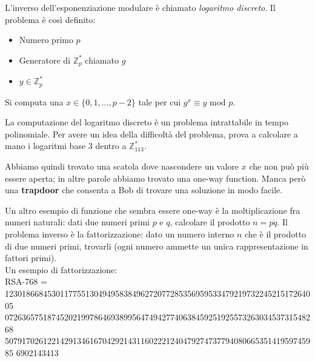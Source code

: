 \medskip

	\begin{algorithmic}
	\EndIf
	\EndFor
	\end{algorithmic}

\medskip

L'inverso dell'esponenziazione modulare è chiamato \textit{logaritmo discreto}.
Il problema è così definito:
\begin{itemize}
	\item Numero primo $p$
	\item Generatore di $\mathbb{Z}_p^*$ chiamato $g$
	\item $y \in \mathbb{Z}_p^*$
\end{itemize}
Si computa una $x \in \{0, 1, ..., p-2\}$ tale per cui $g^x \equiv y \text{ mod } p$.

La computazione del logaritmo discreto è un problema intrattabile in tempo polinomiale. Per avere un idea della difficoltà del problema, prova a calcolare a mano i logaritmi base 3 dentro a $\mathbb{Z}_{113}^*$.

Abbiamo quindi trovato una scatola dove nascondere un valore $x$ che non può più essere aperta; in altre parole abbiamo trovato una one-way function. Manca però una \textbf{trapdoor} che consenta a Bob di trovare una soluzione in modo facile.

Un altro esempio di funzione che sembra essere one-way è la moltiplicazione fra numeri naturali: dati due numeri primi $p$ e $q$, calcolare il prodotto $n = p \dot q$.
Il problema inverso è la fattorizzazione: dato un numero interno $n$ che è il prodotto di due numeri primi, trovarli (ogni numero ammette un unica rappresentazione in fattori primi).\\



Un esempio di fattorizzazione:\\



RSA-768 = 12301866845301177551304949583849627207728535695953347921973224521517264005
07263657518745202199786469389956474942774063845925192557326303453731548268
50791702612214291346167042921431160222124047927473779408066535141959745985
6902143413



